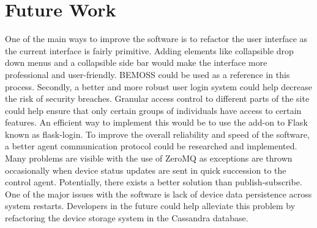 \section{Future Work}
One of the main ways to improve the software is to refactor the user interface as the current interface is fairly primitive. Adding elements like collapsible drop down menus and a collapsible side bar would make the interface more professional and user-friendly. BEMOSS could be used as a reference in this process. Secondly, a better and more robust user login system could help decrease the risk of security breaches. Granular access control to different parts of the site could help ensure that only certain groups of individuals have access to certain features. An efficient way to implement this would be to use the add-on to Flask known as flask-login. To improve the overall reliability and speed of the software, a better agent communication protocol could be researched and implemented. Many problems are visible with the use of ZeroMQ as exceptions are thrown occasionally when device status updates are sent in quick succession to the control agent. Potentially, there exists a better solution than publish-subscribe. One of the major issues with the software is lack of device data persistence across system restarts. Developers in the future could help alleviate this problem by refactoring the device storage system in the Cassandra database.
